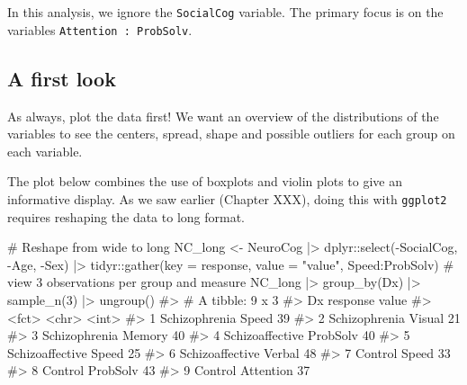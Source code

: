 \documentclass[
  letterpaper,
  10pt,
  krantz2]{krantz}
\makeatletter
\newenvironment{Shaded}{\begin{snugshade}}{\end{snugshade}}
\newcommand{\AttributeTok}[1]{\textcolor[rgb]{0.40,0.45,0.13}{#1}}
\newcommand{\CommentTok}[1]{\textcolor[rgb]{0.37,0.37,0.37}{#1}}
\newcommand{\DecValTok}[1]{\textcolor[rgb]{0.68,0.00,0.00}{#1}}
\newcommand{\FunctionTok}[1]{\textcolor[rgb]{0.28,0.35,0.67}{#1}}
\newcommand{\NormalTok}[1]{\textcolor[rgb]{0.00,0.23,0.31}{#1}}
\newcommand{\OtherTok}[1]{\textcolor[rgb]{0.00,0.23,0.31}{#1}}
\newcommand{\SpecialCharTok}[1]{\textcolor[rgb]{0.37,0.37,0.37}{#1}}
\newcommand{\StringTok}[1]{\textcolor[rgb]{0.13,0.47,0.30}{#1}}
\newenvironment{kframe}{%
  \medskip{}
  \setlength{\fboxsep}{.8em}
  \def\at@end@of@kframe{}%
  \ifinner\ifhmode%
  \def\at@end@of@kframe{\end{minipage}}%
  \begin{minipage}{\columnwidth}%
  \fi\fi%
  \def\FrameCommand##1{\hskip\@totalleftmargin \hskip-\fboxsep
  \colorbox{shadecolor}{##1}\hskip-\fboxsep
      \hskip-\linewidth \hskip-\@totalleftmargin \hskip\columnwidth}%
  \MakeFramed {\advance\hsize-\width
    \@totalleftmargin\z@ \linewidth\hsize
    \@setminipage}}%
{\par\unskip\endMakeFramed%
  \at@end@of@kframe}
\renewenvironment{Shaded}{\begin{kframe}}{\end{kframe}}
\makeatother
\begin{document}
In this analysis, we ignore the \texttt{SocialCog} variable. The primary
focus is on the variables \texttt{Attention\ :\ ProbSolv}.

\subsection{A first look}\label{a-first-look}

As always, plot the data first! We want an overview of the distributions
of the variables to see the centers, spread, shape and possible outliers
for each group on each variable.

The plot below combines the use of boxplots and violin plots to give an
informative display. As we saw earlier (Chapter XXX), doing this with
\texttt{ggplot2} requires reshaping the data to long format.

\begin{Shaded}
\begin{Highlighting}[]
\CommentTok{\# Reshape from wide to long}
\NormalTok{NC\_long }\OtherTok{\textless{}{-}}\NormalTok{ NeuroCog }\SpecialCharTok{|\textgreater{}}
\NormalTok{  dplyr}\SpecialCharTok{::}\FunctionTok{select}\NormalTok{(}\SpecialCharTok{{-}}\NormalTok{SocialCog, }\SpecialCharTok{{-}}\NormalTok{Age, }\SpecialCharTok{{-}}\NormalTok{Sex) }\SpecialCharTok{|\textgreater{}}
\NormalTok{  tidyr}\SpecialCharTok{::}\FunctionTok{gather}\NormalTok{(}\AttributeTok{key =}\NormalTok{ response, }\AttributeTok{value =} \StringTok{"value"}\NormalTok{, Speed}\SpecialCharTok{:}\NormalTok{ProbSolv)}
\CommentTok{\# view 3 observations per group and measure}
\NormalTok{NC\_long }\SpecialCharTok{|\textgreater{}}
  \FunctionTok{group\_by}\NormalTok{(Dx) }\SpecialCharTok{|\textgreater{}}
  \FunctionTok{sample\_n}\NormalTok{(}\DecValTok{3}\NormalTok{) }\SpecialCharTok{|\textgreater{}} \FunctionTok{ungroup}\NormalTok{()}
\CommentTok{\#\textgreater{} \# A tibble: 9 x 3}
\CommentTok{\#\textgreater{}   Dx              response  value}
\CommentTok{\#\textgreater{}   \textless{}fct\textgreater{}           \textless{}chr\textgreater{}     \textless{}int\textgreater{}}
\CommentTok{\#\textgreater{} 1 Schizophrenia   Speed        39}
\CommentTok{\#\textgreater{} 2 Schizophrenia   Visual       21}
\CommentTok{\#\textgreater{} 3 Schizophrenia   Memory       40}
\CommentTok{\#\textgreater{} 4 Schizoaffective ProbSolv     40}
\CommentTok{\#\textgreater{} 5 Schizoaffective Speed        25}
\CommentTok{\#\textgreater{} 6 Schizoaffective Verbal       48}
\CommentTok{\#\textgreater{} 7 Control         Speed        33}
\CommentTok{\#\textgreater{} 8 Control         ProbSolv     43}
\CommentTok{\#\textgreater{} 9 Control         Attention    37}
\end{Highlighting}
\end{Shaded}
\end{document}

